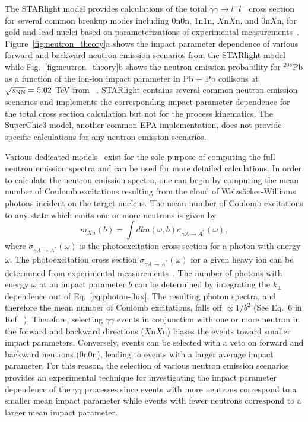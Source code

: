 \documentclass[twocolumn,epjc3]{svjour3}\sloppy
\begin{document}
The STARlight model provides calculations of the total $\gamma\gamma \rightarrow l^+l^-$ cross section for several common breakup modes including $0$n$0$n, $1$n$1$n, $X$n$X$n, and $0$n$X$n, for gold and lead nuclei based on parameterizations of experimental measurements~\cite{baltzHeavyionPartialBeam1996}. 
Figure~\ref{fig:neutron_theory}a shows the impact parameter dependence of various forward and backward neutron emission scenarios from the STARlight model while Fig.~\ref{fig:neutron_theory}b shows the neutron emission probability for $^{208}$Pb as a function of the ion-ion impact parameter in Pb + Pb collisons at $\sqrt{s_{\rm{NN}}} = 5.02$ TeV from ~\cite{brandenburgAcoplanarityQEDPairs2020b}. 
STARlight contains several common neutron emission scenarios and implements the corresponding impact-parameter dependence for the total cross section calculation but not for the process kinematics. The SuperChic3 model, another common EPA implementation, does not provide specific calculations for any neutron emission scenarios.

Various dedicated models~\cite{pshenichnovElectromagneticExcitationFragmentation2011,pshenichnovMutualHeavyIon2001a,brozGeneratorForwardNeutrons2020} exist for the sole purpose of computing the full neutron emission spectra and can be used for more detailed calculations. In order to calculate the neutron emission spectra, one can begin by computing the mean number of Coulomb excitations resulting from the cloud of Weizsäcker-Williams photons incident on the target nucleus.
The mean number of Coulomb excitations to any state which emits one or more neutrons is given by~\cite{brozGeneratorForwardNeutrons2020}
\begin{equation}
    \label{eq:prob1n}
    m_{Xn}(b) = \int dk n(\omega,b) \sigma_{\gamma A\rightarrow A^{*}}(\omega),
\end{equation}
where $\sigma_{\gamma A\rightarrow A^{*}}(\omega)$ is the photoexcitation cross section for a photon with energy $\omega$.
The photoexcitation cross section $\sigma_{\gamma A\rightarrow A^{*}}(\omega)$ for a given heavy ion can be determined from experimental measurements~\cite{veyssierePhotoneutronCrossSections1970,LEPRETRE1981237,CARLOS1984573,PhysRevD.5.1640,PhysRevD.7.1362,PhysRevLett.39.737,ARMSTRONG1972445}. 
The number of photons with energy $\omega$ at an impact parameter $b$ can be determined by integrating the $k_\perp$ dependence out of Eq.~\ref{eq:photon-flux}.  
The resulting photon spectra, and therefore the mean number of Coulomb excitations, falls off $\propto 1/b^2$ (See Eq.~6 in Ref.~\cite{brozGeneratorForwardNeutrons2020}). 
Therefore, selecting $\gamma\gamma$ events in conjunction with one or more neutron in the forward and backward directions ($X$n$X$n) biases the events toward smaller impact parameters.
Conversely, events can be selected with a veto on forward and backward neutrons ($0$n$0$n), leading to events with a larger average impact parameter.
For this reason, the selection of various neutron emission scenarios provides an experimental technique for investigating the impact parameter dependence of the $\gamma\gamma$ processes since events with more neutrons correspond to a smaller mean impact parameter while events with fewer neutrons correspond to a larger mean impact parameter.
\end{document}
